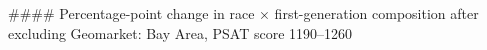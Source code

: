 #### Percentage-point change in race × first-generation composition after excluding Geomarket: Bay Area, PSAT score 1190–1260
